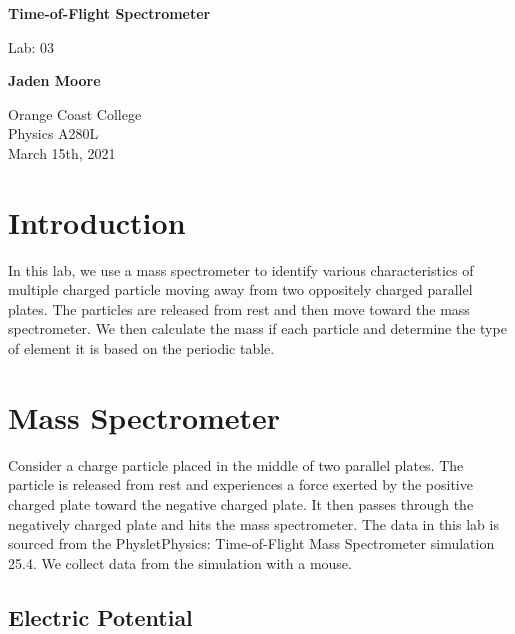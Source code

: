 \documentclass[12pt]{article}
\begin{document}

\begin{titlepage}
    \begin{center}
        \vspace*{1cm}
        \textbf{Time-of-Flight Spectrometer}

        \vspace{0.5cm}
        Lab: 03

        \vspace{1cm}

        \textbf{Jaden Moore}

        \vfill

        Orange Coast College\\
        Physics A280L\\
        March 15th, 2021

    \end{center}
\end{titlepage}

\pagestyle{fancy}
\fancyhf{}
\setlength{\headheight}{15pt}
\cfoot{\thepage}

\section{Introduction}
In this lab, we use a mass spectrometer to identify various characteristics of multiple charged particle moving away from two oppositely charged parallel plates. The particles are released from rest and then move toward the mass spectrometer. We then calculate the mass if each particle and determine the type of element it is based on the periodic table.

\section{Mass Spectrometer}
Consider a charge particle placed in the middle of two parallel plates. The particle is released from rest and experiences a force exerted by the positive charged plate toward the negative charged plate. It then passes through the negatively charged plate and hits the mass spectrometer. The data in this lab is sourced from the Physlet\textregistered \space Physics: Time-of-Flight Mass Spectrometer simulation 25.4. We collect data from the simulation with a mouse.
\subsection{Electric Potential}
\end{document}
